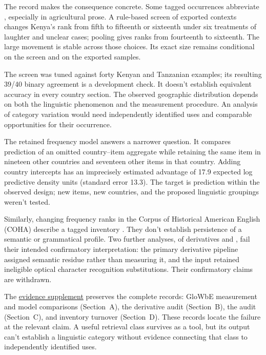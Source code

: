 \documentclass[12pt]{article}
\begin{document}
The  record makes the consequence concrete. Some tagged
occurrences abbreviate , especially in agricultural prose.
A rule-based screen of exported contexts changes Kenya's rank from fifth
to fifteenth or sixteenth under six treatments of laughter and unclear
cases; pooling gives ranks from fourteenth to sixteenth. The large
movement is stable across those choices. Its exact size remains
conditional on the screen and on the exported samples.

The screen was tuned against forty Kenyan and Tanzanian examples;
its resulting 39/40 binary agreement is a development check. It doesn't
establish equivalent accuracy in every country section. The observed
geographic distribution depends on both the linguistic
phenomenon and the measurement procedure. An analysis of category
variation would need independently identified uses and comparable
opportunities for their occurrence.

The retained frequency model answers a narrower question. It compares
prediction of an omitted country--item aggregate while retaining the
same item in nineteen other countries and seventeen other items in
that country. Adding country intercepts has an imprecisely estimated
advantage of 17.9 expected log predictive density units (standard error
13.3). The target is prediction within the observed design; new items,
new countries, and the proposed linguistic groupings weren't tested.

Similarly, changing frequency ranks in the Corpus of Historical American
English (COHA) describe a tagged inventory \citep{davies2010}.
They don't establish persistence of a semantic or grammatical profile.
Two further analyses, of derivatives and , fail their
intended confirmatory interpretation: the primary derivative pipeline
assigned semantic residue rather than measuring it, and the 
input retained ineligible optical character recognition substitutions.
Their confirmatory claims are withdrawn.

The \href{inquiry-relative-evidence-supplement.pdf}{evidence supplement}
preserves the complete records: GloWbE measurement and model comparisons
(Section~A), the derivative audit (Section~B), the  audit
(Section~C), and inventory turnover (Section~D). These records locate
the failure at the relevant claim. A useful retrieval class survives
as a tool, but its output can't establish a linguistic category
without evidence connecting that class to independently identified uses.
\end{document}
